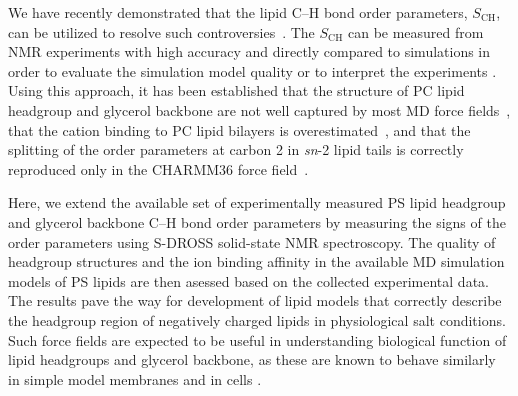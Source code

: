\documentclass[aps,prl,superscriptaddress,twocolumn]{revtex4}
\begin{document}
We have recently demonstrated that the lipid C--H bond order parameters, $S_\mathrm{CH}$,
can be utilized to resolve such controversies~\cite{botan15,catte16}. The $S_\mathrm{CH}$ can be
measured from NMR experiments with high accuracy and directly compared to simulations
in order to evaluate the simulation model quality or to interpret the experiments \cite{ollila16}. Using this approach,
it has been established that the structure of PC lipid headgroup and glycerol backbone are not well
captured by most MD force fields~\cite{botan15}, that the cation binding to PC
lipid bilayers is overestimated~\cite{catte16}, and that the splitting of the order parameters at
carbon 2 in {\it sn}-2 lipid tails is correctly reproduced only in the CHARMM36 force field~\cite{piggot17}.%
%

Here, we extend the available set of experimentally measured PS lipid headgroup and
glycerol backbone C--H bond order parameters
by measuring the signs of the order parameters using S-DROSS solid-state NMR spectroscopy.
The quality of headgroup structures and the ion binding affinity in
the available MD simulation models of PS lipids are then asessed based on the collected experimental data.
The results pave the way
for development of lipid models that correctly describe 
the headgroup region of negatively charged lipids in physiological salt
conditions. Such force fields are expected to be useful in understanding
biological function of lipid headgroups and glycerol backbone, as
these are known to behave similarly in simple model membranes and in cells \cite{gally81,scherer87,seelig90}.
\end{document}
